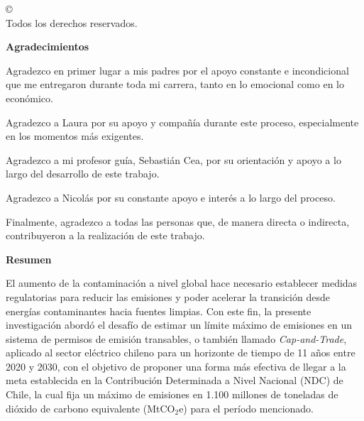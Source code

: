 
  \onehalfspacing


  \cleardoublepage
  \thispagestyle{empty}
  \begin{center}
    \copyright\ \nombreautor\ \anio \\
    Todos los derechos reservados.
  \end{center}



  \cleardoublepage {}
  \begin{center} \Large \textbf{Agradecimientos} 
  \end{center}
  Agradezco en primer lugar a mis padres por el apoyo constante e incondicional que me entregaron durante toda mi carrera, tanto en lo emocional como en lo económico.

  Agradezco a Laura por su apoyo y compañía durante este proceso, especialmente en los momentos más exigentes.
    
  Agradezco a mi profesor guía, Sebastián Cea, por su orientación y apoyo a lo largo del desarrollo de este trabajo.

  Agradezco a Nicolás por su constante apoyo e interés a lo largo del proceso.

  Finalmente, agradezco a todas las personas que, de manera directa o indirecta, contribuyeron a la realización de este trabajo.


  \cleardoublepage
   
  \begin{center} \Large \textbf{Resumen} \end{center}
  
El aumento de la contaminación a nivel global hace necesario establecer medidas regulatorias para reducir las emisiones y poder acelerar la transición desde energías contaminantes hacia fuentes limpias. Con este fin, la presente investigación abordó el desafío de estimar un límite máximo de emisiones en un sistema de permisos de emisión transables, o también llamado \textit{Cap-and-Trade}, aplicado al sector eléctrico chileno para un horizonte de tiempo de 11 años entre 2020 y 2030, con el objetivo de proponer una forma más efectiva de llegar a la meta establecida en la Contribución Determinada a Nivel Nacional (NDC) de Chile, la cual fija un máximo de emisiones en 1.100 millones de toneladas de dióxido de carbono equivalente (MtCO$_2$e) para el período mencionado. \medskip

